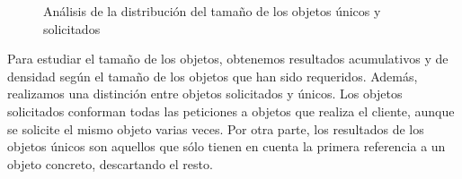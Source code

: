 \documentclass[twocolumn]{Jornadas}
\begin{document}
\begin{figure}[ht!]
\caption{Análisis de la distribución del tamaño de los objetos únicos y solicitados}
\label{fig:tamObjetos}
\end{figure}

Para estudiar el tamaño de los objetos, obtenemos resultados acumulativos y de densidad según el tamaño de los objetos que han sido requeridos.
Además, realizamos una distinción entre objetos solicitados y únicos.
Los objetos solicitados conforman todas las peticiones a objetos que realiza el cliente, aunque se solicite el mismo objeto varias veces. Por otra parte, los resultados de los objetos únicos son aquellos que sólo tienen en cuenta la primera referencia a un objeto concreto, descartando el resto.
\end{document}
